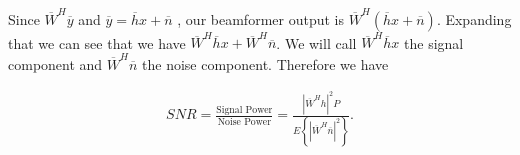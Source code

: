                     Since
                    $\overline{W}^{H}\overline{y}$ and
                    $\overline{y}=\overline{h}x+\overline{n}$
                    , our beamformer output is
                    $\overline{W}^{H}\left(\overline{h}x
                    +\overline{n}\right)$.  Expanding that we can see that
                    we have $\overline{W}^{H}\overline{h}x
                    +\overline{W}^{H}\overline{n}$.  We will call
                    $\overline{W}^{H}\overline{h}x$ the signal component
                    and $\overline{W}^{H}\overline{n}$ the noise component.
                    Therefore we have

                    \begin{center}
                    \begin{align}
                    SNR=\frac{\text{Signal Power}}{\text{Noise Power}}
                    =\frac{\left|\overline{W}^{H}h\right|^{2}P}
                    {E \left\{\left|\overline{W}^{H}\overline{n}\right|^{2}
                    \right\}}.
                    \end{align}
                    \end{center}

